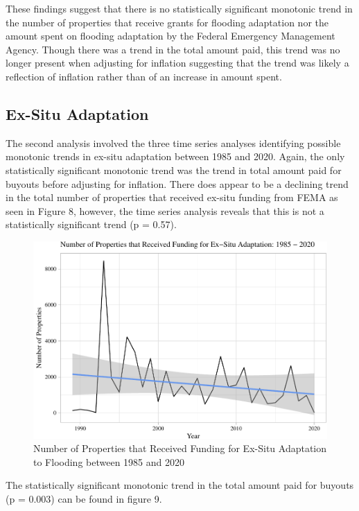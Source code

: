 \documentclass[
  12pt,
]{article}
\begin{document}
These findings suggest that there is no statistically significant
monotonic trend in the number of properties that receive grants for
flooding adaptation nor the amount spent on flooding adaptation by the
Federal Emergency Management Agency. Though there was a trend in the
total amount paid, this trend was no longer present when adjusting for
inflation suggesting that the trend was likely a reflection of inflation
rather than of an increase in amount spent.

\hypertarget{ex-situ-adaptation}{%
\subsection{Ex-Situ Adaptation}\label{ex-situ-adaptation}}

The second analysis involved the three time series analyses identifying
possible monotonic trends in ex-situ adaptation between 1985 and 2020.
Again, the only statistically significant monotonic trend was the trend
in total amount paid for buyouts before adjusting for inflation. There
does appear to be a declining trend in the total number of properties
that received ex-situ funding from FEMA as seen in Figure 8, however,
the time series analysis reveals that this is not a statistically
significant trend (p = 0.57).

\begin{figure}
\centering
\includegraphics{finalreport_files/figure-latex/unnamed-chunk-17-1.pdf}
\caption{Number of Properties that Received Funding for Ex-Situ
Adaptation to Flooding between 1985 and 2020}
\end{figure}

\newpage

The statistically significant monotonic trend in the total amount paid
for buyouts (p = 0.003) can be found in figure 9.
\end{document}
